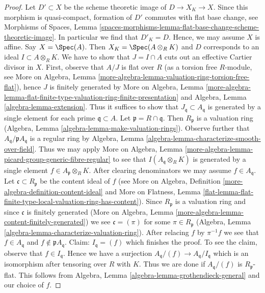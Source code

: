 \begin{proof}
Let $D' \subset X$ be the scheme theoretic image of $D \to X_K \to X$.
Since this morphism is quasi-compact, formation of $D'$
commutes with flat base change, see
Morphisms of Spaces, Lemma
\ref{spaces-morphisms-lemma-flat-base-change-scheme-theoretic-image}.
In particular we find that $D'_K = D$. Hence,
we may assume $X$ is affine. Say $X = \Spec(A)$.
Then $X_K = \Spec(A \otimes_R K)$ and $D$ corresponds to
an ideal $I \subset A \otimes_R K$. We have to show that
$J = I \cap A$ cuts out an effective Cartier divisor in $X$.
First, observe that $A/J$ is flat over $R$ (as a torsion
free $R$-module, see More on Algebra, Lemma
\ref{more-algebra-lemma-valuation-ring-torsion-free-flat}),
hence $J$ is finitely generated by
More on Algebra, Lemma
\ref{more-algebra-lemma-flat-finite-type-valuation-ring-finite-presentation}
and
Algebra, Lemma \ref{algebra-lemma-extension}.
Thus it suffices to show that $J_\mathfrak q \subset A_\mathfrak q$
is generated by a single element for each prime $\mathfrak q \subset A$.
Let $\mathfrak p = R \cap \mathfrak q$. Then
$R_\mathfrak p$ is a valuation ring
(Algebra, Lemma \ref{algebra-lemma-make-valuation-rings}).
Observe further that $A_\mathfrak q/\mathfrak p A_\mathfrak q$
is a regular ring by Algebra, Lemma
\ref{algebra-lemma-characterize-smooth-over-field}.
Thus we may apply More on Algebra, Lemma
\ref{more-algebra-lemma-picard-group-generic-fibre-regular}
to see that $I(A_\mathfrak q \otimes_R K)$ is generated by
a single element $f \in A_\mathfrak p \otimes_R K$.
After clearing denominators we may assume $f \in A_\mathfrak q$.
Let $\mathfrak c \subset R_\mathfrak p$ be the content ideal of $f$
(see More on Algebra, Definition \ref{more-algebra-definition-content-ideal}
and More on Flatness, Lemma
\ref{flat-lemma-flat-finite-type-local-valuation-ring-has-content}).
Since $R_\mathfrak p$ is a valuation ring and
since $\mathfrak c$ is finitely generated
(More on Algebra, Lemma \ref{more-algebra-lemma-content-finitely-generated})
we see $\mathfrak c = (\pi)$ for some $\pi \in R_\mathfrak p$
(Algebra, Lemma \ref{algebra-lemma-characterize-valuation-ring}).
After relacing $f$ by $\pi^{-1}f$ we see that $f \in A_\mathfrak q$
and $f \not \in \mathfrak pA_\mathfrak q$.
Claim: $I_\mathfrak q = (f)$ which finishes the proof.
To see the claim, observe that $f \in I_\mathfrak q$.
Hence we have a surjection $A_\mathfrak q/(f) \to A_\mathfrak q/I_\mathfrak q$
which is an isomorphism after tensoring over $R$ with $K$.
Thus we are done if
$A_\mathfrak q/(f)$ is $R_\mathfrak p$-flat.
This follows from
Algebra, Lemma \ref{algebra-lemma-grothendieck-general}
and our choice of $f$.
\end{proof}











